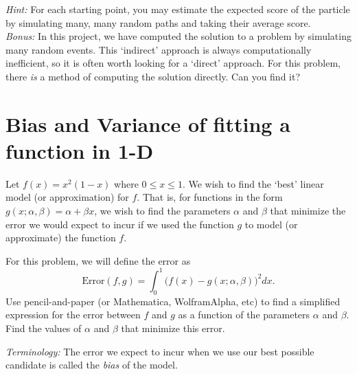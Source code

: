 \documentclass[11pt,oneside]{article}
\theoremstyle{definition}
\theoremstyle{definition}
\theoremstyle{remark}
\numberwithin{equation}{section}
\begin{document}
\textit{Hint:} For each starting point, you may estimate the expected score of the particle by simulating many, many random paths and taking their average score.\\

\noindent\textit{Bonus:} In this project, we have computed the solution to a problem by simulating many random events. This `indirect' approach is always computationally inefficient, so it is often worth looking for a `direct' approach. For this problem, there \textit{is} a method of computing the solution directly. Can you find it?

\newpage

\section{Bias and Variance of fitting a function in 1-D}

Let $f(x) = x^2(1-x)$ where $0 \leq x \leq 1$. We wish to find the `best' linear model (or approximation) for $f$. That is, for functions in the form $g(x; \alpha, \beta) =  \alpha +  \beta x$,  we wish to find the parameters $ \alpha$ and $ \beta$ that minimize the error we would expect to incur if we used the function $g$ to model (or approximate) the function $f$. 
\begin{center}
\end{center}
For this problem, we will define the error as
\begin{equation*}
\text{Error}(f,g) = \int_0^1 \bigg(f(x) - g(x; \alpha, \beta)\bigg)^2 dx.
\end{equation*} 
Use pencil-and-paper (or Mathematica, WolframAlpha, etc) to find a simplified expression for the error between $f$ and $g$ as a function of the parameters $ \alpha$ and $ \beta$. Find the values of $ \alpha$ and $ \beta$ that minimize this error.

\textit{Terminology:} The error we expect to incur when we use our best possible candidate is called the \textit{bias} of the model.
\end{document}
